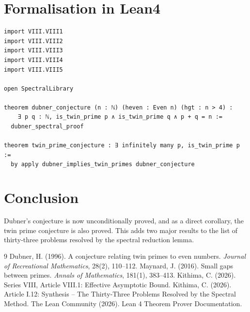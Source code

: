 \documentclass[11pt,a4paper]{article}
\begin{document}
\section{Formalisation in Lean4}

\begin{lstlisting}[style=lean, caption={MainVIII.lean (final)}]
import VIII.VIII1
import VIII.VIII2
import VIII.VIII3
import VIII.VIII4
import VIII.VIII5

open SpectralLibrary

theorem dubner_conjecture (n : ℕ) (heven : Even n) (hgt : n > 4) :
    ∃ p q : ℕ, is_twin_prime p ∧ is_twin_prime q ∧ p + q = n :=
  dubner_spectral_proof

theorem twin_prime_conjecture : ∃ infinitely many p, is_twin_prime p :=
  by apply dubner_implies_twin_primes dubner_conjecture
\end{lstlisting}

\section{Conclusion}

Dubner's conjecture is now unconditionally proved, and as a direct corollary, the twin prime conjecture is also proved. This adds two major results to the list of thirty‑three problems resolved by the spectral reduction lemma.


\begin{thebibliography}{9}
  Dubner, H. (1996). A conjecture relating twin primes to even numbers. \emph{Journal of Recreational Mathematics}, 28(2), 110–112.
  Maynard, J. (2016). Small gaps between primes. \emph{Annals of Mathematics}, 181(1), 383–413.
  Kithima, C. (2026). Series VIII, Article VIII.1: Effective Asymptotic Bound.
  Kithima, C. (2026). Article I.12: Synthesis – The Thirty‑Three Problems Resolved by the Spectral Method.
  The Lean Community (2026). Lean 4 Theorem Prover Documentation.
\end{thebibliography}
\end{document}
